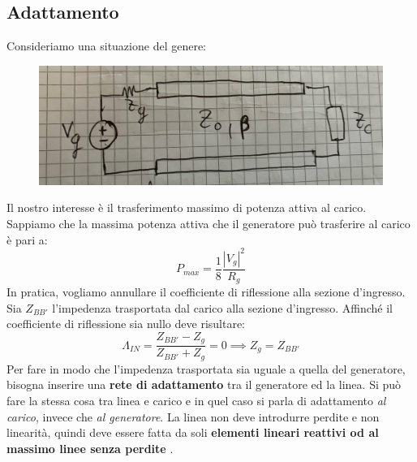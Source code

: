 \documentclass{book}
\begin{document}
    \subsection*{Adattamento}
        Consideriamo una situazione del genere:
        \begin{figure}[h!]
            \center  
            \includegraphics[width=0.65\linewidth]{Chapter_two/chapt2img17}
        \end{figure}
        Il nostro interesse è il trasferimento massimo di potenza attiva al carico. Sappiamo che 
        la massima potenza attiva che il generatore può trasferire al carico è pari a:
        \begin{equation}
            P_{max} = \frac{1}{8} \frac{|V_{g}| ^{2}}{R_{g}}
        \end{equation}
        In pratica, vogliamo annullare il coefficiente di riflessione alla sezione d'ingresso.
        Sia $Z_{BB'}$ l'impedenza trasportata dal carico alla sezione d'ingresso. Affinché il coefficiente di riflessione 
        sia nullo deve risultare:
        \begin{equation}
            \Lambda_{IN} = \frac{Z_{BB'}-Z_{g}}{Z_{BB'}+Z_{g}} = 0 \implies Z_{g} = Z_{BB'}
        \end{equation}
        Per fare in modo che l'impedenza trasportata sia uguale a quella del generatore, bisogna inserire una
        \textbf{rete di adattamento} tra il generatore ed la linea. Si può fare la stessa cosa tra linea e carico e in quel caso si 
        parla di adattamento \textit{al carico}, invece che \textit{al generatore}. La linea non deve introdurre perdite e 
        non linearità, quindi deve essere fatta da soli \textbf{elementi lineari reattivi od al massimo linee senza perdite }.
\end{document}
